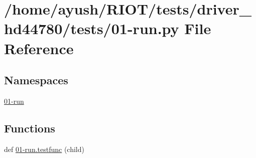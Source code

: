 \hypertarget{driver__hd44780_2tests_201-run_8py}{}\section{/home/ayush/\+R\+I\+O\+T/tests/driver\+\_\+hd44780/tests/01-\/run.py File Reference}
\label{driver__hd44780_2tests_201-run_8py}
\subsection*{Namespaces}
\begin{DoxyCompactItemize}
\item 
 \hyperlink{namespace01-run}{01-\/run}
\end{DoxyCompactItemize}
\subsection*{Functions}
\begin{DoxyCompactItemize}
\item 
def \hyperlink{namespace01-run_aff983ffd4ab0e6bf8e7e58970e4a10bb}{01-\/run.\+testfunc} (child)
\end{DoxyCompactItemize}
